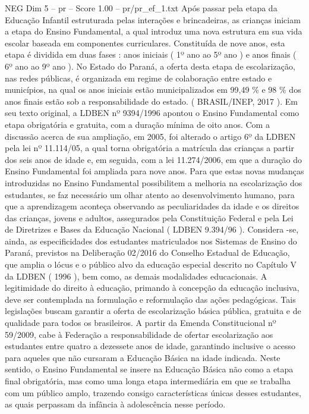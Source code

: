 \begin{textsample}{NEG Dim 5 – pr – Score 1.00 – pr/pr\_ef\_1.txt}  \label{ex:f5_neg_239}
Após passar pela etapa da Educação Infantil estruturada pelas interações e brincadeiras, as crianças iniciam a etapa do Ensino Fundamental, a qual introduz uma nova estrutura em sua vida escolar baseada em componentes curriculares.
Constituída de nove anos, esta etapa é dividida em duas fases : anos iniciais ( 1º ano ao 5º ano ) e anos finais ( 6º ano ao 9º ano ).
No Estado do Paraná, a oferta desta etapa de escolarização, nas redes públicas, é organizada em regime de colaboração entre estado e municípios, na qual os anos iniciais estão municipalizados em 99,49 \% e 98 \% dos anos finais estão sob a responsabilidade do estado. ( BRASIL/INEP, 2017 ).
Em seu texto original, a LDBEN nº 9394/1996 apontou o Ensino Fundamental como etapa obrigatória e gratuita, com a duração mínima de oito anos.
Com a discussão acerca de sua ampliação, em 2005, foi alterado o artigo 6º da LDBEN pela lei nº 11.114/05, a qual torna obrigatória a matrícula das crianças a partir dos seis anos de idade e, em seguida, com a lei 11.274/2006, em que a duração do Ensino Fundamental foi ampliada para nove anos.
Para que estas novas mudanças introduzidas no Ensino Fundamental possibilitem a melhoria na escolarização dos estudantes, se faz necessário um olhar atento ao desenvolvimento humano, para que a aprendizagem aconteça observando as peculiaridades da idade e os direitos das crianças, jovens e adultos, assegurados pela Constituição Federal e pela Lei de Diretrizes e Bases da Educação Nacional ( LDBEN 9.394/96 ).
Considera -se, ainda, as especificidades dos estudantes matriculados nos Sistemas de Ensino do Paraná, previstos na Deliberação 02/2016 do Conselho Estadual de Educação, que amplia o lócus e o público alvo da educação especial descrito no Capítulo V da LDBEN ( 1996 ), bem como, as demais modalidades educacionais.
A legitimidade do direito à educação, primando à concepção da educação inclusiva, deve ser contemplada na formulação e reformulação das ações pedagógicas.
Tais legislações buscam garantir a oferta de escolarização básica pública, gratuita e de qualidade para todos os brasileiros.
A partir da Emenda Constitucional nº 59/2009, cabe à Federação a responsabilidade de ofertar escolarização aos estudantes entre quatro a dezessete anos de idade, garantindo inclusive o acesso para aqueles que não cursaram a Educação Básica na idade indicada.
Neste sentido, o Ensino Fundamental se insere na Educação Básica não como a etapa final obrigatória, mas como uma longa etapa intermediária em que se trabalha com um público amplo, trazendo consigo características únicas desses estudantes, as quais perpassam da infância à adolescência nesse período.

\end{textsample}
